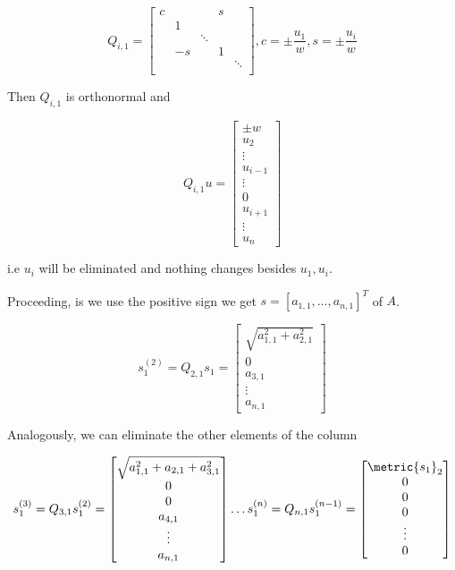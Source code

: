 \[ 
    Q_{i,1} = 
    \begin{bmatrix}
        c &        &         & s &        \\
          & 1      &         &   &        \\
          &        & \ddots  &   &        \\
          & -s     &         & 1 &        \\
          &        &         &   & \ddots \\
    \end{bmatrix}
    ,
    c = \pm \frac{u_1}{w}, s = \pm \frac{u_i}{w}
\]

Then \(Q_{i,1}\) is orthonormal and 

\[
    Q_{i,1}u = 
    \begin{bmatrix}
        \pm w \\ 
        u_2  \\ 
        \vdots \\ 
        u_{i - 1} \\ 
        \vdots \\ 
        0  \\ 
        u_{i + 1} \\ 
        \vdots \\ 
        u_n
    \end{bmatrix}
\]

i.e \(u_i\) will be eliminated and nothing changes besides \(u_1, u_i\).

Proceeding, is we use the positive sign we get \(s = [a_{1,1}, \dots, a_{n,1}]^T\)
of \(A\).

\[
    s_{1}^{(2)} = Q_{2,1} s_1 = 
    \begin{bmatrix}
        \sqrt{a_{1,1}^2 + a_{2,1}^2} \\
        0 \\
        a_{3,1} \\
        \vdots \\
        a_{n,1}
    \end{bmatrix}
\]

Analogously, we can eliminate the other elements of the column

\[
    s_{1}^{(3)} = Q_{3,1} s_1^{(2)} = 
    \begin{bmatrix}
        \sqrt{a_{1,1}^2 + a_{2,1} + a_{3,1}^2} \\
        0 \\
        0 \\
        a_{4,1} \\ 
        \vdots \\
        a_{n,1}
    \end{bmatrix}
    \dots
    s_{1}^{(n)} = Q_{n,1} s_1^{(n - 1)} =
    \begin{bmatrix}
        \metric{s_1}_2 \\
        0 \\
        0 \\
        0 \\ 
        \vdots \\
        0
    \end{bmatrix}
\]

